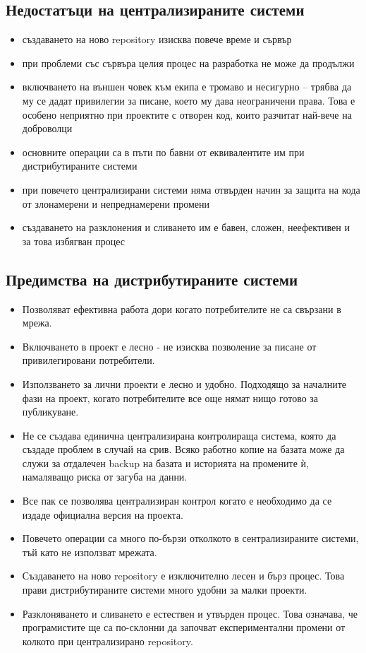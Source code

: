 \documentclass[a4paper]{article}
\begin{document}
  \subsection{Недостатъци на централизираните системи}
    \begin{itemize}
      \item създаването на ново repository изисква повече време и сървър
      \item при проблеми със сървъра целия процес на разработка не може да продължи
      \item включването на външен човек към екипа е тромаво и несигурно -- трябва да му се дадат привилегии за писане, което му дава неограничени права. Това е особено неприятно при проектите с отворен код, които разчитат най-вече на доброволци
      \item основните операции са в пъти по бавни от еквивалентите им при дистрибутираните системи
      \item при повечето централизирани системи няма отвърден начин за защита на кода от злонамерени и непреднамерени промени
      \item създаването на разклонения и сливането им е бавен, сложен, неефективен и за това избягван процес
    \end{itemize}

  \subsection{Предимства на дистрибутираните системи}
    \begin{itemize}
      \item Позволяват ефективна работа дори когато потребителите не са
      свързани в мрежа.
      \item Включването в проект е лесно - не изисква позволение за писане от
      привилегировани потребители.
      \item Използването за лични проекти е лесно и удобно. Подходящо за
      началните фази на проект, когато потребителите все още нямат нищо готово
      за публикуване.
      \item Не се създава единична централизирана контролираща система, която
      да създаде проблем в случай на срив. Всяко работно копие на базата може
      да служи за отдалечен backup на базата и историята на промените ѝ,
      намаляващо риска от загуба на данни.
      \item Все пак се позволява централизиран контрол когато е необходимо да
      се издаде официална версия на проекта.
      \item Повечето операции са много по-бързи отколкото в сентрализираните
      системи, тъй като не използват мрежата.
      \item Създаването на ново repository е изключително лесен и бърз процес.
      Това прави дистрибутираните системи много удобни за малки проекти.
      \item Разклоняването и сливането е естествен и утвърден процес. Това
      означава, че програмистите ще са по-склонни да започват експериментални
      промени от колкото при централизирано repository.
    \end{itemize}
\end{document}

